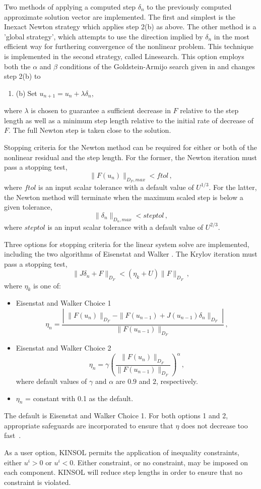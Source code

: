 Two methods of applying a computed step $\delta_n$ to the previously computed
approximate solution vector are implemented.  The 
first and simplest is the Inexact Newton strategy which applies step 2(b) 
as above.  
The other method is a 'global strategy',
which attempts to use the direction implied by $\delta_n$ 
in the most efficient way for furthering convergence of the nonlinear problem. 
This technique 
is implemented in the second strategy, called Linesearch.  This option
employs both the $\alpha$ and $\beta$ conditions of the Goldstein-Armijo
search given in \cite{DeSc:96} and changes step 2(b) to
\begin{enumerate}
  \addtocounter{enumi}{1}
\item{(b)$\;$Set $u_{n+1} = u_n + \lambda \delta_n$},
\end{enumerate}
where $\lambda$ is chosen to guarantee a sufficient decrease in $F$ 
relative to the step length as well as a minimum step length relative 
to the initial rate of decrease of $F$.  The full Newton step is taken
close to the solution.

Stopping criteria for the Newton method can be required for either or 
both of the nonlinear residual and the step length.  For the former, 
the Newton iteration must pass a stopping test,
\[ \|F(u_n)\|_{D_F,max} < ftol \, , \]
where $ftol$ is an input scalar tolerance with a default value of $U^{1/3}$.
For the latter, the Newton method will terminate when the maximum scaled step
is below a given tolerance,
\[ \|\delta_n\|_{D_u,max} < steptol \, , \]
where $steptol$ is an input scalar tolerance with a default value of 
$U^{2/3}$.

Three options for stopping criteria for the linear system solve are
implemented, including the two 
algorithms of Eisenstat and Walker \cite{EiWa:96}.
The Krylov iteration must pass a stopping test,
\[ \|J \delta_n + F\|_{D_F} < (\eta_k + U) \|F\|_{D_F} \, , \]
where $\eta_k$ is one of:
\begin{itemize}
\item Eisenstat and Walker Choice 1
  \[ 
  \eta_n = \frac{\left|\; \|F(u_n)\|_{D_F}  
      - \|F(u_{n-1}) + J(u_{n-1}) \delta_n \|_{D_F} 
      \; \right|}
  {\|F(u_{n-1})\|_{D_F}} \, ,  
  \]
\item Eisenstat and Walker Choice 2
  \[ 
  \eta_n = \gamma 
  \left( \frac{ \|F(u_n)\|_{D_F}}{\|F(u_{n-1})\|_{D_F}} \right)^{\alpha} \, ,
  \] 
where default values of $\gamma$ and $\alpha$ are $0.9$ and $2$,
 respectively. 
\item  $\eta_n$ = constant with 0.1 as the default.
\end{itemize}
The default is Eisenstat and Walker Choice 1. For both options 1 and 2, 
appropriate safeguards are incorporated to ensure that $\eta$ does not 
decrease too fast~\cite{EiWa:96}.

As a user option, KINSOL permits the application of inequality
constraints, either $u^i > 0$ or $u^i < 0$.  Either constraint, or
no constraint, may be imposed on each component.  KINSOL will reduce 
step lengths in order to ensure that no constraint is violated.


